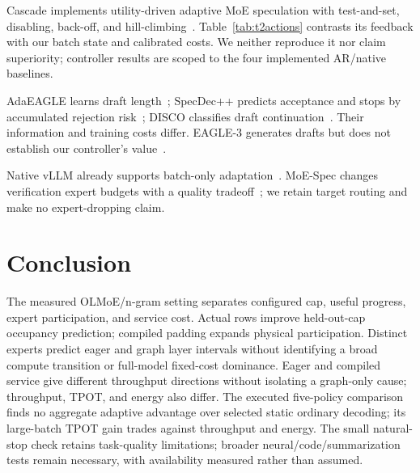 \documentclass[conference,letterpaper]{IEEEtran}
\begin{document}
Cascade implements utility-driven adaptive MoE speculation with test-and-set, disabling, back-off, and hill-climbing~\cite{cascade}. Table~\ref{tab:t2actions} contrasts its feedback with our batch state and calibrated costs. We neither reproduce it nor claim superiority; controller results are scoped to the four implemented AR/native baselines.

AdaEAGLE learns draft length~\cite{adaeagle}; SpecDec++ predicts acceptance and stops by accumulated rejection risk~\cite{specdecpp}; DISCO classifies draft continuation~\cite{disco}. Their information and training costs differ. EAGLE-3 generates drafts but does not establish our controller's value~\cite{eagle3}.

Native vLLM already supports batch-only adaptation~\cite{vllmdynamic,vllmconfig}. MoE-Spec changes verification expert budgets with a quality tradeoff~\cite{moespec}; we retain target routing and make no expert-dropping claim.

\section{Conclusion}
The measured OLMoE/n-gram setting separates configured cap, useful progress, expert participation, and service cost. Actual rows improve held-out-cap occupancy prediction; compiled padding expands physical participation. Distinct experts predict eager and graph layer intervals without identifying a broad compute transition or full-model fixed-cost dominance. Eager and compiled service give different throughput directions without isolating a graph-only cause; throughput, TPOT, and energy also differ. The executed five-policy comparison finds no aggregate adaptive advantage over selected static ordinary decoding; its large-batch TPOT gain trades against throughput and energy. The small natural-stop check retains task-quality limitations; broader neural/code/summarization tests remain necessary, with availability measured rather than assumed.



\end{document}

